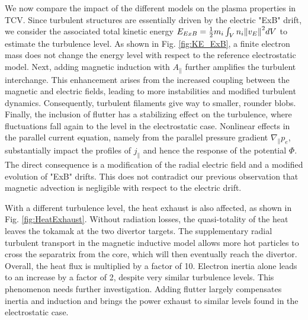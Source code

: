We now compare the impact of the different models on the plasma properties in TCV. Since turbulent structures are essentially driven by the electric "ExB" drift, we consider the associated total kinetic energy $E_{ExB} = \frac{1}{2}m_i \int_V n_i \norm{v_E}^2 dV$ to estimate the turbulence level. As shown in Fig. \ref{fig:KE_ExB}, a finite electron mass does not change the energy level with respect to the reference electrostatic model. Next, adding magnetic induction with $A_\parallel$ further amplifies the turbulent interchange. This enhancement arises from the increased coupling between the magnetic and electric fields, leading to more instabilities and modified turbulent dynamics. Consequently, turbulent filaments give way to smaller, rounder blobs. Finally, the inclusion of flutter has a stabilizing effect on the turbulence, where fluctuations fall again to the level in the electrostatic case. Nonlinear effects in the parallel current equation, namely from the parallel pressure gradient $\nabla_\parallel p_e$, substantially impact the profiles of $j_\parallel$ and hence the response of the potential $\Phi$. The direct consequence is a modification of the radial electric field and a modified evolution of "ExB" drifts. This does not contradict our previous observation that magnetic advection is negligible with respect to the electric drift. \newline

With a different turbulence level, the heat exhaust is also affected, as shown in Fig. \ref{fig:HeatExhaust}. Without radiation losses, the quasi-totality of the heat leaves the tokamak at the two divertor targets. The supplementary radial turbulent transport in the magnetic inductive model allows more hot particles to cross the separatrix from the core, which will then eventually reach the divertor. Overall, the heat flux is multiplied by a factor of 10. Electron inertia alone leads to an increase by a factor of 2, despite very similar turbulence levels. This phenomenon needs further investigation. Adding flutter largely compensates inertia and induction and brings the power exhaust to similar levels found in the electrostatic case. \newline

